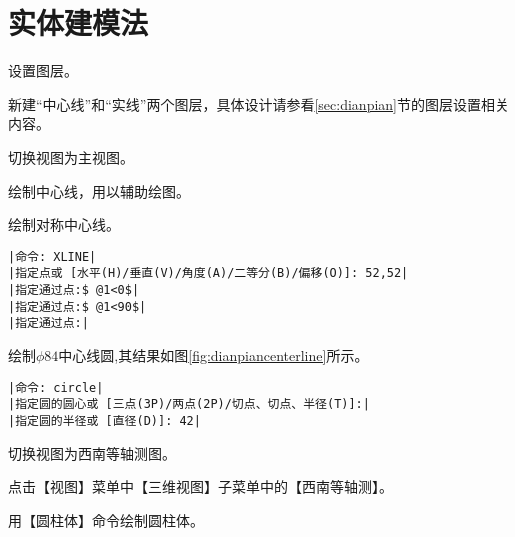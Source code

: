 \section{实体建模法}
\begin{procedure}
\item 设置图层。

新建“中心线”和“实线”两个图层，具体设计请参看\ref{sec:dianpian}节的图层设置相关内容。
\item 切换视图为主视图。

\item 绘制中心线，用以辅助绘图。

绘制对称中心线。
\begin{lstlisting}
|命令: XLINE|
|指定点或 [水平(H)/垂直(V)/角度(A)/二等分(B)/偏移(O)]: 52,52|
|指定通过点:$ @1<0$|
|指定通过点:$ @1<90$|
|指定通过点:|
\end{lstlisting}
绘制$\phi 84$中心线圆,其结果如图\ref{fig:dianpiancenterline}所示。
\begin{lstlisting}
|命令: circle|
|指定圆的圆心或 [三点(3P)/两点(2P)/切点、切点、半径(T)]:|
|指定圆的半径或 [直径(D)]: 42|
\end{lstlisting}
\begin{figure}[htbp]
\centering
\begin{floatrow}
\end{floatrow}
\end{figure}
\item 切换视图为西南等轴测图。

点击【视图】菜单中【三维视图】子菜单中的【西南等轴测】。
\item 用【圆柱体】命令绘制圆柱体。


\end{procedure}
